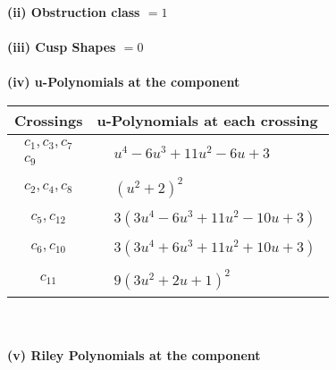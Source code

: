 \documentclass[1p]{elsarticle_modified}
\theoremstyle{definition}
\begin{document}
\flushleft \textbf{(ii) Obstruction class $= 1$}\\~\\
\flushleft \textbf{(iii) Cusp Shapes $= 0$}\\~\\
\newpage\renewcommand{\arraystretch}{1}
\flushleft \textbf{(iv) u-Polynomials at the component}\newline \\
\begin{tabular}{m{50pt}|m{274pt}}
Crossings & \hspace{64pt}u-Polynomials at each crossing \\
\hline $$\begin{aligned}c_{1},c_{3},c_{7}\\c_{9}\end{aligned}$$&$\begin{aligned}
&u^4-6 u^3+11 u^2-6 u+3
\end{aligned}$\\
\hline $$\begin{aligned}c_{2},c_{4},c_{8}\end{aligned}$$&$\begin{aligned}
&(u^2+2)^2
\end{aligned}$\\
\hline $$\begin{aligned}c_{5},c_{12}\end{aligned}$$&$\begin{aligned}
&3(3 u^4-6 u^3+11 u^2-10 u+3)
\end{aligned}$\\
\hline $$\begin{aligned}c_{6},c_{10}\end{aligned}$$&$\begin{aligned}
&3(3 u^4+6 u^3+11 u^2+10 u+3)
\end{aligned}$\\
\hline $$\begin{aligned}c_{11}\end{aligned}$$&$\begin{aligned}
&9(3 u^2+2 u+1)^2
\end{aligned}$\\
\hline
\end{tabular}\\~\\
\newpage\renewcommand{\arraystretch}{1}
\flushleft \textbf{(v) Riley Polynomials at the component}\newline \\
\end{document}

